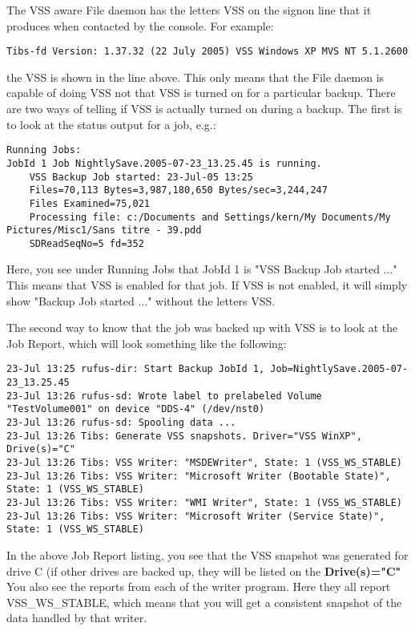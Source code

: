The VSS aware File daemon has the letters VSS on the signon line that
it produces when contacted by the console. For example:
\begin{verbatim}
Tibs-fd Version: 1.37.32 (22 July 2005) VSS Windows XP MVS NT 5.1.2600
\end{verbatim}
the VSS is shown in the line above. This only means that the File daemon
is capable of doing VSS not that VSS is turned on for a particular backup.
There are two ways of telling if VSS is actually turned on during a backup.
The first is to look at the status output for a job, e.g.:
\footnotesize
\begin{verbatim}
Running Jobs:
JobId 1 Job NightlySave.2005-07-23_13.25.45 is running.
    VSS Backup Job started: 23-Jul-05 13:25
    Files=70,113 Bytes=3,987,180,650 Bytes/sec=3,244,247
    Files Examined=75,021
    Processing file: c:/Documents and Settings/kern/My Documents/My Pictures/Misc1/Sans titre - 39.pdd
    SDReadSeqNo=5 fd=352
\end{verbatim}
\normalsize
Here, you see under Running Jobs that JobId 1 is "VSS Backup Job started ..." 
This means that VSS is enabled for that job.  If VSS is not enabled, it will
simply show "Backup Job started ..." without the letters VSS.

The second way to know that the job was backed up with VSS is to look at the 
Job Report, which will look something like the following:
\footnotesize
\begin{verbatim}
23-Jul 13:25 rufus-dir: Start Backup JobId 1, Job=NightlySave.2005-07-23_13.25.45
23-Jul 13:26 rufus-sd: Wrote label to prelabeled Volume "TestVolume001" on device "DDS-4" (/dev/nst0)
23-Jul 13:26 rufus-sd: Spooling data ...
23-Jul 13:26 Tibs: Generate VSS snapshots. Driver="VSS WinXP", Drive(s)="C"
23-Jul 13:26 Tibs: VSS Writer: "MSDEWriter", State: 1 (VSS_WS_STABLE)
23-Jul 13:26 Tibs: VSS Writer: "Microsoft Writer (Bootable State)", State: 1 (VSS_WS_STABLE)
23-Jul 13:26 Tibs: VSS Writer: "WMI Writer", State: 1 (VSS_WS_STABLE)
23-Jul 13:26 Tibs: VSS Writer: "Microsoft Writer (Service State)", State: 1 (VSS_WS_STABLE)
\end{verbatim}
\normalsize
In the above Job Report listing, you see that the VSS snapshot was generated for drive C (if
other drives are backed up, they will be listed on the {\bf Drive(s)="C"}  You also see the
reports from each of the writer program.  Here they all report VSS\_WS\_STABLE, which means
that you will get a consistent snapshot of the data handled by that writer.

